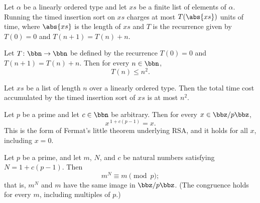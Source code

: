 \begin{theorem}
\label{time_insertionSort_le_rec}
\leanok
{}
Let $\alpha$ be a linearly ordered type and let $xs$ be a finite list of elements of
$\alpha$. Running the timed insertion sort on $xs$ charges at most $T(\abs{xs})$ units
of time, where $\abs{xs}$ is the length of $xs$ and $T$ is the recurrence given by $T(0)
= 0$ and $T(n+1) = T(n) + n$.
\end{theorem}

\begin{theorem}
\label{timeInsertionSortRec_le_sq}
\leanok
{}
Let $T \colon \bbn \to \bbn$ be defined by the recurrence $T(0) = 0$ and $T(n+1) = T(n)
+ n$. Then for every $n \in \bbn$,
\[
T(n) \le n^2.
\]
\end{theorem}

\begin{theorem}
\label{time_insertionSort_le_sq}
\leanok
{}
Let $\mathit{xs}$ be a list of length $n$ over a linearly ordered type. Then the total
time cost accumulated by the timed insertion sort of $\mathit{xs}$ is at most $n^2$.
\end{theorem}

\begin{lemma}
\label{RSA.rsa_core}
\leanok
{}
Let $p$ be a prime and let $c \in \bbn$ be arbitrary. Then for every $x \in \bbz/p\bbz$,
\[
x^{\,1 + c(p-1)} = x .
\]
This is the form of Fermat's little theorem underlying RSA, and it holds for all $x$,
including $x = 0$.
\end{lemma}

\begin{lemma}
\label{RSA.rsa_zmod_of_factor}
\leanok
{}
Let $p$ be a prime, and let $m$, $N$, and $c$ be natural numbers satisfying $N = 1 +
c(p-1)$. Then
\[
m^{N} \equiv m \pmod{p};
\]
that is, $m^{N}$ and $m$ have the same image in $\bbz/p\bbz$. (The congruence holds for
every $m$, including multiples of $p$.)
\end{lemma}

